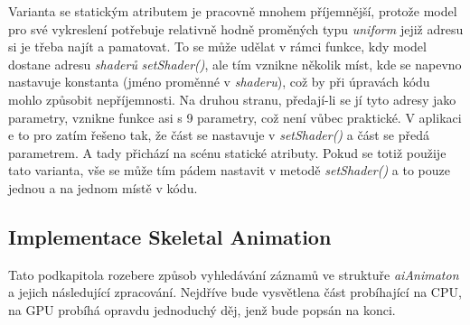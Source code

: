  Varianta se statickým atributem je pracovně mnohem příjemnější, protože model pro své vykreslení potřebuje relativně hodně proměných typu \emph{uniform} jejiž adresu si je třeba najít a pamatovat. To se může udělat v rámci funkce, kdy model dostane adresu \emph{shaderů} \emph{setShader()}, ale tím vznikne několik míst, kde se napevno nastavuje konstanta (jméno proměnné v \emph{shaderu}), což by při úpravách kódu mohlo způsobit nepříjemnosti. Na druhou stranu, předají-li se jí tyto adresy jako parametry, vznikne funkce asi s 9 parametry, což není vůbec praktické. V aplikaci e to pro zatím řešeno tak, že část se nastavuje v \emph{setShader()} a část se předá parametrem. A tady přichází na scénu statické atributy. Pokud se totiž použije tato varianta, vše se může tím pádem nastavit v metodě \emph{setShader()} a to pouze jednou a na jednom místě v kódu. 

\subsection{Implementace Skeletal Animation}\label{SA-I}
Tato podkapitola rozebere způsob vyhledávání záznamů ve struktuře \emph{aiAnimaton} a jejich následující zpracování. Nejdříve bude vysvětlena část probíhající na CPU, na GPU probíhá opravdu jednoduchý děj, jenž bude popsán na konci.

